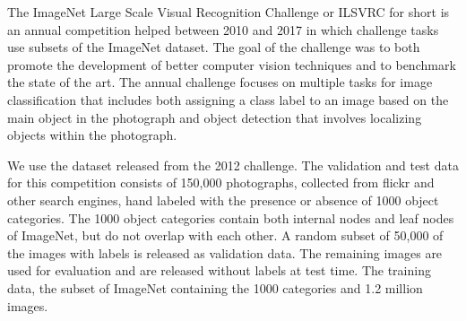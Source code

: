 The ImageNet Large Scale Visual Recognition Challenge or ILSVRC for short is an 
annual competition helped between 2010 and 2017 in which challenge tasks use 
subsets of the ImageNet dataset.  The goal of the challenge was to both promote 
the development of better computer vision techniques and to benchmark the state 
of the art.
The annual challenge focuses on multiple tasks for image classification that 
includes both assigning a class label to an image based on the main object in 
the photograph and object detection that involves localizing objects within the 
photograph.

We use the dataset released from the 2012 challenge.  The validation and test 
data for this competition consists of 150,000 photographs, collected from flickr 
and other search engines, hand labeled with the presence or absence of 1000 
object categories. The 1000 object categories contain both internal nodes and 
leaf nodes of ImageNet, but do not overlap with each other. A random subset of 
50,000 of the images with labels is released as validation data. The remaining 
images are used for evaluation and are released without labels at test time.  
The training data, the subset of ImageNet containing the 1000 categories and 1.2 
million images. 
